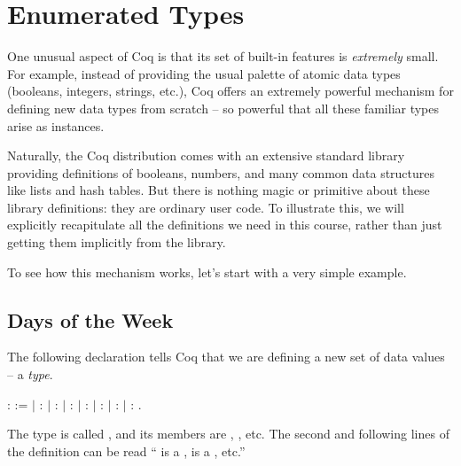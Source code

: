 \documentclass[12pt]{report}
\begin{document}
\section{Enumerated Types}



 One unusual aspect of Coq is that its set of built-in
    features is \textit{extremely} small.  For example, instead of providing
    the usual palette of atomic data types (booleans, integers,
    strings, etc.), Coq offers an extremely powerful mechanism for
    defining new data types from scratch -- so powerful that all these
    familiar types arise as instances.  


    Naturally, the Coq distribution comes with an extensive standard
    library providing definitions of booleans, numbers, and many
    common data structures like lists and hash tables.  But there is
    nothing magic or primitive about these library definitions: they
    are ordinary user code.  To illustrate this, we will explicitly
    recapitulate all the definitions we need in this course, rather
    than just getting them implicitly from the library.


    To see how this mechanism works, let's start with a very simple
    example. \begin{coqdoccode}
\coqdocemptyline
\end{coqdoccode}
\subsection{Days of the Week}



 The following declaration tells Coq that we are defining
    a new set of data values -- a \textit{type}. \begin{coqdoccode}
\coqdocemptyline
\coqdocnoindent
{}  :  :=\coqdoceol
\coqdocindent{1.00em}
\ensuremath{|}  : \coqdoceol
\coqdocindent{1.00em}
\ensuremath{|}  : \coqdoceol
\coqdocindent{1.00em}
\ensuremath{|}  : \coqdoceol
\coqdocindent{1.00em}
\ensuremath{|}  : \coqdoceol
\coqdocindent{1.00em}
\ensuremath{|}  : \coqdoceol
\coqdocindent{1.00em}
\ensuremath{|}  : \coqdoceol
\coqdocindent{1.00em}
\ensuremath{|}  : .\coqdoceol
\coqdocemptyline
\end{coqdoccode}
The type is called , and its members are ,
    , etc.  The second and following lines of the definition
    can be read `` is a ,  is a , etc.''
\end{document}
